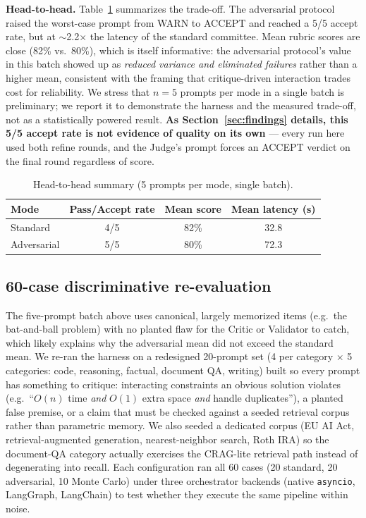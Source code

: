 \documentclass{article}
\begin{document}
\textbf{Head-to-head.} Table~\ref{tab:headtohead} summarizes the trade-off. The adversarial
protocol raised the worst-case prompt from WARN to ACCEPT and reached a 5/5 accept rate, but
at $\sim$2.2$\times$ the latency of the standard committee. Mean rubric scores are close
(82\% vs.\ 80\%), which is itself informative: the adversarial protocol's value in this batch
showed up as \emph{reduced variance and eliminated failures} rather than a higher mean,
consistent with the framing that critique-driven interaction trades cost for reliability.
We stress that $n=5$ prompts per mode in a single batch is preliminary; we report it to
demonstrate the harness and the measured trade-off, not as a statistically powered result.
\textbf{As Section~\ref{sec:findings} details, this 5/5 accept rate is not evidence of quality
on its own} --- every run here used both refine rounds, and the Judge's prompt forces an ACCEPT
verdict on the final round regardless of score.

\begin{table}[t]
\centering
\caption{Head-to-head summary (5 prompts per mode, single batch).}
\label{tab:headtohead}
\begin{tabular}{@{}lccc@{}}
\toprule
Mode & Pass/Accept rate & Mean score & Mean latency (s) \\
\midrule
Standard    & 4/5 & 82\% & 32.8 \\
Adversarial & 5/5 & 80\% & 72.3 \\
\bottomrule
\end{tabular}
\end{table}

\subsection{60-case discriminative re-evaluation}
\label{sec:sixty-case}
The five-prompt batch above uses canonical, largely memorized items (e.g.\ the bat-and-ball
problem) with no planted flaw for the Critic or Validator to catch, which likely explains why
the adversarial mean did not exceed the standard mean. We re-ran the harness on a redesigned
20-prompt set (4 per category $\times$ 5 categories: code, reasoning, factual, document QA,
writing) built so every prompt has something to critique: interacting constraints an obvious
solution violates (e.g.\ ``$O(n)$ time \emph{and} $O(1)$ extra space \emph{and} handle
duplicates''), a planted false premise, or a claim that must be checked against a seeded
retrieval corpus rather than parametric memory. We also seeded a dedicated corpus (EU AI Act,
retrieval-augmented generation, nearest-neighbor search, Roth IRA) so the document-QA category
actually exercises the CRAG-lite retrieval path instead of degenerating into recall. Each
configuration ran all 60 cases (20 standard, 20 adversarial, 10 Monte Carlo) under three
orchestrator backends (native \texttt{asyncio}, LangGraph, LangChain) to test whether they
execute the same pipeline within noise.
\end{document}
